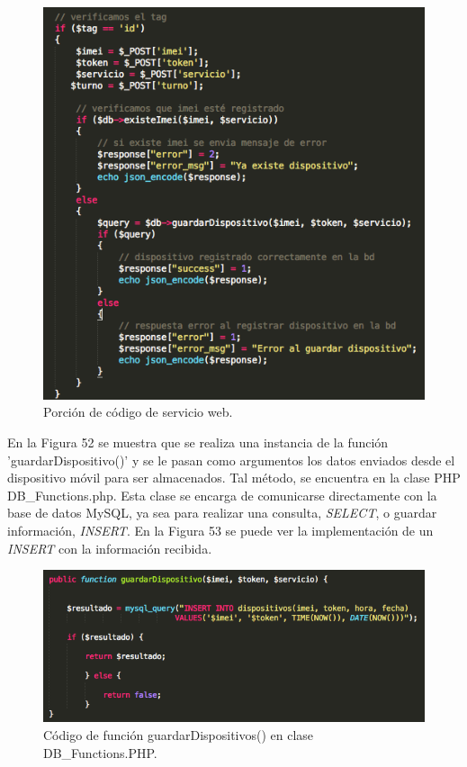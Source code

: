 \begin{figure}[H]
\centering
\includegraphics[scale=0.70]{images/capitulo5/index.png}
\caption{Porción de código de servicio web.}
\label{registrarDispositivo}
\end{figure}

En la Figura 52 se muestra que se realiza una instancia de la función 'guardarDispositivo()' y se le pasan como argumentos los datos enviados desde el dispositivo móvil para ser almacenados. Tal método, se encuentra en la clase PHP DB\_Functions.php. Esta clase se encarga de comunicarse directamente con la base de datos MySQL, ya sea para realizar una consulta, \textit{SELECT}, o guardar información, \textit{INSERT}. En la Figura 53 se puede ver la implementación de un \textit{INSERT} con la información recibida.\\

\begin{figure}[H]
\centering
\includegraphics[scale=0.60]{images/capitulo5/guardarDisp.png}
\caption{Código de función guardarDispositivos() en clase DB\_Functions.PHP.}
\label{registrarDispositivo}
\end{figure}


